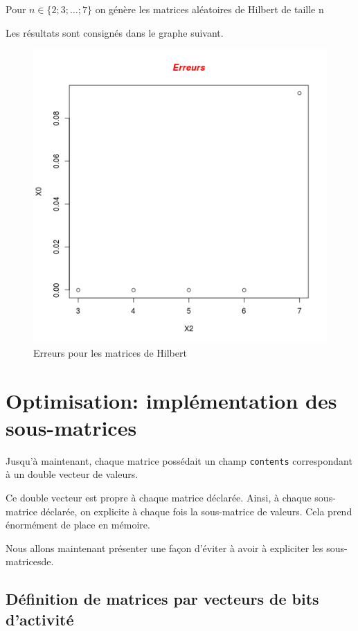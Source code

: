 \documentclass[a4paper,11pt]{article}
\begin{document}
Pour $n \in \{2;3;\dots;7\}$ on génère les matrices aléatoires de Hilbert de taille n

Les résultats sont consignés dans le graphe suivant.


\begin{figure}
  \centering
  \includegraphics[scale=0.5]{Error.png}
  \caption{Erreurs pour les matrices de Hilbert}
  \label{fig:phd}

\end{figure}


\section{Optimisation: implémentation des sous-matrices}


Jusqu'à maintenant, chaque matrice possédait un champ \texttt{contents} correspondant à un double vecteur de valeurs.

Ce double vecteur est propre à chaque matrice déclarée. Ainsi, à chaque sous-matrice déclarée, on explicite à chaque fois la sous-matrice de valeurs. Cela prend énormément de place en mémoire.

Nous allons maintenant présenter une façon d'éviter à avoir à expliciter les sous-matricesde.

\subsection{Définition de matrices par vecteurs de bits d'activité}
\end{document}
